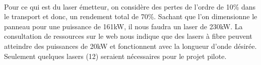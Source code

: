 \paragraph{}Pour ce qui est du laser émetteur, on considère des pertes de l'ordre de 10\% dans le transport et donc, un rendement total de 70\%. Sachant que l'on dimensionne le panneau pour une puissance de 161kW, il nous faudra un laser de 230kW. La consultation de ressources sur le web nous indique que des lasers à fibre peuvent atteindre des puissances de 20kW et fonctionnent avec la longueur d'onde désirée. Seulement quelques lasers (12) seraient nécessaires pour le projet pilote. 